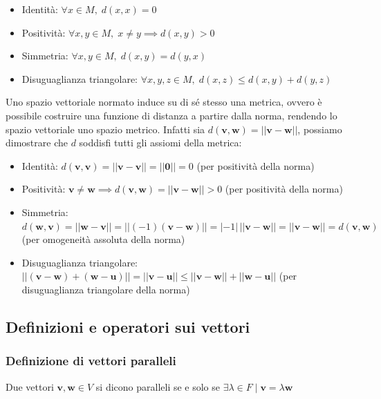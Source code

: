 \documentclass{article}
\begin{document}
    \begin{itemize}
        \item Identità: $\forall x \in M, \; d(x, x) = 0$
        \item Positività: $\forall x, y \in M, \; x \neq y \implies d(x, y) > 0$
        \item Simmetria: $\forall x, y \in M, \; d(x, y) = d(y, x)$
        \item Disuguaglianza triangolare: $\forall x, y, z \in M, \; d(x, z) \leq d(x, y) + d(y, z)$
    \end{itemize}

    Uno spazio vettoriale normato induce su di sé stesso una metrica, ovvero è possibile costruire una funzione di distanza a partire dalla norma, rendendo lo spazio vettoriale uno spazio metrico.
    Infatti sia $d(\mathbf{v}, \mathbf{w}) = ||\mathbf{v} - \mathbf{w}||$, possiamo dimostrare che $d$ soddisfi tutti gli assiomi della metrica:

    \begin{itemize}
        \item Identità: $d(\mathbf{v}, \mathbf{v}) = ||\mathbf{v} - \mathbf{v}|| = ||\mathbf{0}|| = 0$ (per positività della norma)
        \item Positività: $\mathbf{v} \neq \mathbf{w} \implies d(\mathbf{v}, \mathbf{w}) = ||\mathbf{v} - \mathbf{w}|| > 0$ (per positività della norma)
        \item Simmetria: $d(\mathbf{w}, \mathbf{v}) = ||\mathbf{w} - \mathbf{v}|| = ||(-1)(\mathbf{v} - \mathbf{w})|| = |-1|\,||\mathbf{v} - \mathbf{w}|| = ||\mathbf{v} - \mathbf{w}|| = d(\mathbf{v}, \mathbf{w})$ (per omogeneità assoluta della norma)
        \item Disuguaglianza triangolare: $||(\mathbf{v} - \mathbf{w}) + (\mathbf{w} - \mathbf{u})|| = ||\mathbf{v} - \mathbf{u}|| \leq ||\mathbf{v} - \mathbf{w}|| + ||\mathbf{w} - \mathbf{u}||$ (per disuguaglianza triangolare della norma)
    \end{itemize}



\vspace{10pt}
\subsection{Definizioni e operatori sui vettori}
    \subsubsection{Definizione di vettori paralleli}
        Due vettori $\mathbf{v}, \mathbf{w} \in V$ si dicono paralleli se e solo se $\exists \lambda \in F \; | \; \mathbf{v} = \lambda \mathbf{w}$  
\end{document}
